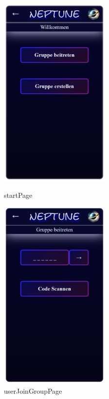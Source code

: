 \documentclass[oneside, ngerman]{sdqtechreport}
\begin{document}
\begin{figure}
   \begin{minipage}[b]{.4\linewidth} %
      \includegraphics[width=5.5cm]{LATEX/Pflichtenheft/GraphicDesigns/startPage.png}
      \caption{startPage}
   \end{minipage}
   \hspace{2cm}%
   \begin{minipage}[b]{.4\linewidth} %
      \includegraphics[width=5.5cm]{LATEX/Pflichtenheft/GraphicDesigns/userJoinGroupPage.png}
      \caption{userJoinGroupPage}
   \end{minipage}
   

\end{figure}
\end{document}
